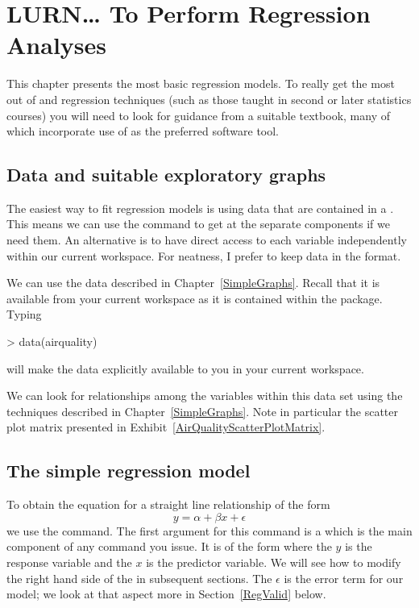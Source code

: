 \chapter{LURN\ldots{} To Perform Regression Analyses} 
\label{Regression} 
 
 

 
This chapter presents the most basic regression models. To really get the most out of \R{} and regression techniques (such as those taught in second or later statistics courses) you will need to look for guidance from a suitable textbook, many of which incorporate use of \R{} as the preferred software tool. 
 
\section{Data and suitable exploratory graphs} 
 
The easiest way to fit regression models is using data that are contained in a . This means we can use the  command to get at the separate components if we need them. An alternative is to have direct access to each variable independently within our current workspace. For neatness, I prefer to keep data in the  format. 
 
We can use the  data described in Chapter~\ref{SimpleGraphs}. Recall that it is available from your current workspace as it is contained within the  package. Typing 
\begin{Schunk}
\begin{Sinput}
> data(airquality) 
\end{Sinput}
\end{Schunk}
will make the data explicitly available to you in your current \R{} workspace. 
 
We can look for relationships among the variables within this data set using the techniques described in Chapter~\ref{SimpleGraphs}. Note in particular the scatter plot matrix presented in Exhibit~\ref{AirQualityScatterPlotMatrix}. 
 
 
 
\section{The simple regression model} 
 
To obtain the equation for a straight line relationship of the form \begin{equation} 
y=\alpha+\beta{}x +\epsilon 
\end{equation} we use the  command. The first argument for this command is a  which is the main component of any  command you issue. It is of the form  where the $y$ is the response variable and the $x$ is the predictor variable. We will see how to modify the right hand side of the  in subsequent sections. The $\epsilon$ is the error term for our model; we look at that aspect more in Section~\ref{RegValid}    below.  

